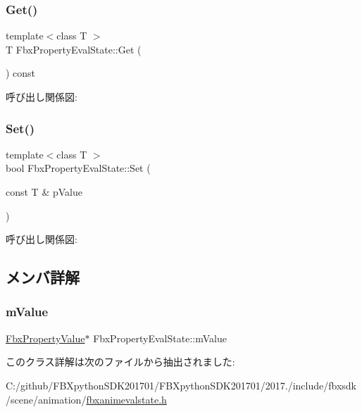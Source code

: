 \subsubsection{\texorpdfstring{Get()}{Get()}}
{\footnotesize\ttfamily template$<$class T $>$ \\
T Fbx\+Property\+Eval\+State\+::\+Get (\begin{DoxyParamCaption}{ }\end{DoxyParamCaption}) const}

呼び出し関係図\+:
\mbox{\label{class_fbx_property_eval_state_ae6e8cdc04a89d508399aeb2d125eb4b7}} 
\subsubsection{\texorpdfstring{Set()}{Set()}}
{\footnotesize\ttfamily template$<$class T $>$ \\
bool Fbx\+Property\+Eval\+State\+::\+Set (\begin{DoxyParamCaption}\item[{const T \&}]{p\+Value }\end{DoxyParamCaption})}

呼び出し関係図\+:


\subsection{メンバ詳解}
\mbox{\label{class_fbx_property_eval_state_a8b773480c867eff130caea6646f81cae}} 
\subsubsection{\texorpdfstring{m\+Value}{mValue}}
{\footnotesize\ttfamily \hyperlink{class_fbx_property_value}{Fbx\+Property\+Value}$\ast$ Fbx\+Property\+Eval\+State\+::m\+Value}



このクラス詳解は次のファイルから抽出されました\+:\begin{DoxyCompactItemize}
\item 
C\+:/github/\+F\+B\+Xpython\+S\+D\+K201701/\+F\+B\+Xpython\+S\+D\+K201701/2017./include/fbxsdk/scene/animation/\hyperlink{fbxanimevalstate_8h}{fbxanimevalstate.\+h}\end{DoxyCompactItemize}
